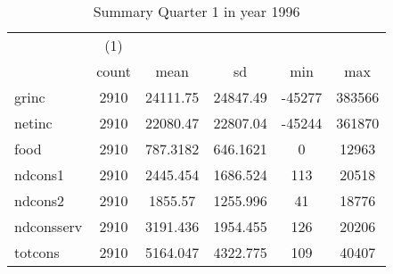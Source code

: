 \begin{table}[htbp]\centering
\def\sym#1{\ifmmode^{#1}\else\(^{#1}\)\fi}
\caption{Summary Quarter 1 in year 1996 \label{sum\_Q1\_y1996}}
\begin{tabular}{l*{1}{ccccc}}
\hline\hline
            &\multicolumn{1}{c}{(1)}&            &            &            &            \\
            &       count&        mean&          sd&         min&         max\\
\hline
grinc       &        2910&    24111.75&    24847.49&      -45277&      383566\\
netinc      &        2910&    22080.47&    22807.04&      -45244&      361870\\
food        &        2910&    787.3182&    646.1621&           0&       12963\\
ndcons1     &        2910&    2445.454&    1686.524&         113&       20518\\
ndcons2     &        2910&     1855.57&    1255.996&          41&       18776\\
ndconsserv  &        2910&    3191.436&    1954.455&         126&       20206\\
totcons     &        2910&    5164.047&    4322.775&         109&       40407\\
\hline\hline
\end{tabular}
\end{table}
